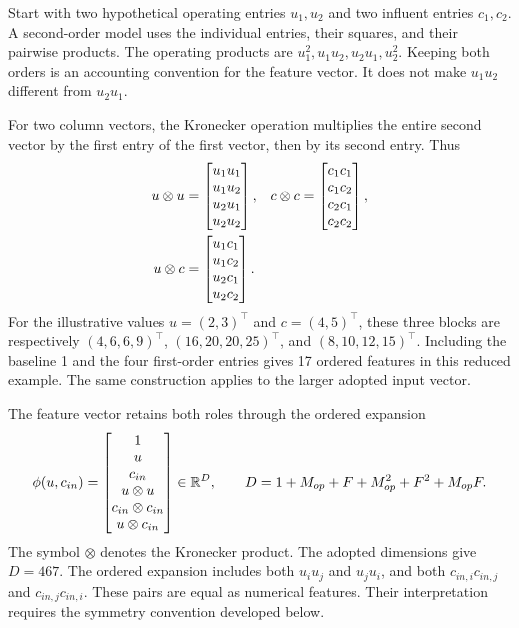 Start with two hypothetical operating entries \(u_1,u_2\) and two influent entries \(c_1,c_2\). A second-order model uses the individual entries, their squares, and their pairwise products. The operating products are \(u_1^2,u_1u_2,u_2u_1,u_2^2\). Keeping both orders is an accounting convention for the feature vector. It does not make \(u_1u_2\) different from \(u_2u_1\).

For two column vectors, the Kronecker operation multiplies the entire second vector by the first entry of the first vector, then by its second entry. Thus
\begin{equation}
\equationname{Illustrative operating, influent, and mixed Kronecker products}
\label{eq:icsor_small_kronecker}
\begin{aligned}
u\otimes u&=\begin{bmatrix}u_1u_1\\u_1u_2\\u_2u_1\\u_2u_2\end{bmatrix},
&c\otimes c&=\begin{bmatrix}c_1c_1\\c_1c_2\\c_2c_1\\c_2c_2\end{bmatrix},\\
u\otimes c&=\begin{bmatrix}u_1c_1\\u_1c_2\\u_2c_1\\u_2c_2\end{bmatrix}.
\end{aligned}
\end{equation}
For the illustrative values \(u=(2,3)^\top\) and \(c=(4,5)^\top\), these three blocks are respectively \((4,6,6,9)^\top\), \((16,20,20,25)^\top\), and \((8,10,12,15)^\top\). Including the baseline 1 and the four first-order entries gives 17 ordered features in this reduced example. The same construction applies to the larger adopted input vector.

The feature vector retains both roles through the ordered expansion
\begin{equation}
\equationname{Second-order driver feature vector and its dimension}
\label{eq:icsor_features}
\phi(u,c_{in})=
\begin{bmatrix}
1\\u\\c_{in}\\u\otimes u\\c_{in}\otimes c_{in}\\u\otimes c_{in}
\end{bmatrix}
\in\mathbb{R}^{D},
\qquad
D=1+M_{op}+F+M_{op}^{2}+F^{2}+M_{op}F.
\end{equation}
The symbol \(\otimes\) denotes the Kronecker product. The adopted dimensions give \(D=467\). The ordered expansion includes both \(u_i u_j\) and \(u_j u_i\), and both \(c_{in,i}c_{in,j}\) and \(c_{in,j}c_{in,i}\). These pairs are equal as numerical features. Their interpretation requires the symmetry convention developed below.

